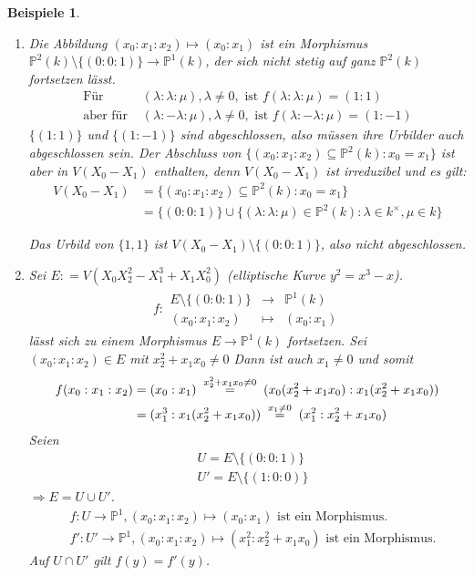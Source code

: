 \documentclass[a4paper,12pt]{report}
\theoremstyle{break}
\theoremstyle{nonumberbreak}
\newtheorem{nnBsp}{Beispiele}
\theoremstyle{nonumberplain}
\newcommand{\defeqr}[0]{\mathrel{\mathop:}=}
\newcommand{\gleichwegen}[1]{\ensuremath{\DOTSB\;\stackrel{#1}{=}\;}}
\newcommand{\Abb}[5]{\ensuremath{#1:\begin{array}{ccc} #2 & \longrightarrow & #3 \\ #4 & \longmapsto & #5 \end{array}}}
\renewcommand{\labelenumi}{\theenumi}
\renewcommand{\theenumi}{(\alph{enumi})}
\begin{document}
\begin{nnBsp}
  \begin{enumerate}
    \renewcommand{\labelenumi}{\arabic{enumi}.)}
  \item Die Abbildung $(x_0:x_1:x_2)\mapsto(x_0:x_1)$ ist ein Morphismus $\mathbb P^2(k)\setminus \{(0:0:1)\}\longrightarrow\mathbb P^1(k)$,
    der sich nicht stetig auf ganz $\mathbb P^2(k)$ fortsetzen lässt.
    \begin{align*}
      \text{Für } &(\lambda:\lambda:\mu),\lambda\neq 0,\text{ ist } f(\lambda:\lambda:\mu)=(1:1) \\
      \text{aber für } &(\lambda:-\lambda:\mu),\lambda\neq 0,\text{ ist } f(\lambda:-\lambda:\mu)=(1:-1)
    \end{align*}
    $\{(1:1)\}$ und $\{(1:-1)\}$ sind abgeschlossen, also müssen ihre Urbilder auch abgeschlossen sein.
    Der Abschluss von $\{(x_0:x_1:x_2)\subseteq\mathbb P^2(k):x_0=x_1\}$ ist aber in $V(X_0-X_1)$ enthalten, 
    denn $V(X_0-X_1)$ ist irreduzibel und es gilt:
    \begin{align*}
      V(X_0-X_1)&=\{(x_0:x_1:x_2)\subseteq\mathbb P^2(k):x_0=x_1\} \\
      &=\{(0:0:1)\}\cup\{(\lambda:\lambda:\mu)\in\mathbb P^2(k):\lambda\in k^\times,\mu\in k\}
    \end{align*}

Das Urbild von $\{1,1\}$ ist $V(X_0-X_1)\setminus\{(0:0:1)\}$, also nicht abgeschlossen.

  \item Sei $E\defeqr V(X_0X_2^2-X_1^3+X_1X_0^2)$ (elliptische Kurve $y^2=x^3-x$). \\
    \begin{align*}
    \Abb{f}{E\setminus\{(0:0:1)\}}{\mathbb P^1(k)}{(x_0:x_1:x_2)}{(x_0:x_1)}      
    \end{align*}
    lässt sich zu einem Morphismus $E\longrightarrow\mathbb P^1(k)$ fortsetzen.
Sei $(x_0:x_1:x_2)\in E$ mit $x^2_2+x_1x_0\neq 0$ Dann ist auch $x_1\neq 0$ und somit
    \begin{align*}
      f(x_0:x_1:x_2)&=(x_0:x_1)\gleichwegen{x_2^2+x_1x_0\neq0}(x_0(x_2^2+x_1x_0):x_1(x_2^2+x_1x_0)) \\
      &=(x_1^3:x_1(x_2^2+x_1x_0))\gleichwegen{x_1\neq0}(x_1^2:x_2^2+x_1x_0)
    \end{align*}
    Seien
    \begin{align*}
      &U =E\setminus\{(0:0:1)\} \\
      &U'=E\setminus\{(1:0:0)\}
    \end{align*}
    $\Rightarrow E=U\cup U'$.
    \begin{align*}
      &f:U\longrightarrow\mathbb P^1, (x_0:x_1:x_2)\mapsto(x_0:x_1) \text{ ist ein Morphismus.} \\
      &f':U'\longrightarrow\mathbb P^1, (x_0:x_1:x_2)\mapsto(x_1^2:x_2^2+x_1x_0) \text{ ist ein Morphismus.}
    \end{align*}
    Auf $U\cap U'$ gilt $f(y)=f'(y)$.
  \end{enumerate}
\end{nnBsp}
\end{document}
